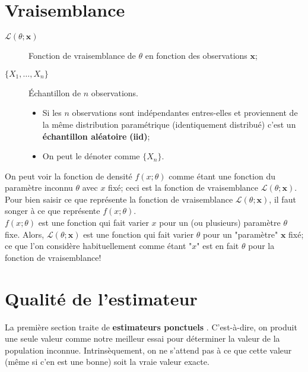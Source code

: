 \documentclass[10pt, french]{article}
\begin{document}
\begin{multicols*}{2}
\columnbreak
\section{Vraisemblance}
\begin{distributions}[Notation]
\begin{description}
	\item[$\mathcal{L}(\theta; \bm{x})$]	Fonction de vraisemblance de $\theta$ en fonction des observations $\bm{x}$;
	\item[$\{X_{1}, \dots, X_{n}\}$]	Échantillon de $n$ observations.
		\begin{itemize}[leftmargin = *]
		\item	Si les $n$ observations sont indépendantes entres-elles et proviennent de la même distribution paramétrique (identiquement distribué) c'est un \textbf{échantillon aléatoire} \textbf{(iid)};
		\item	On peut le dénoter comme $\{X_{n}\}$.
		\end{itemize}
\end{description}
\end{distributions}

On peut voir la fonction de densité $f(x; \theta)$ comme étant une fonction du paramètre inconnu $\theta$ avec $x$ fixé; ceci est la fonction de vraisemblance $\mathcal{L}(\theta; \bm{x})$.
Pour bien saisir ce que représente la fonction de vraisemblance $\mathcal{L}(\theta; \bm{x})$, il faut songer à ce que représente $f(x; \theta)$. \\
$f(x; \theta)$ est une fonction qui fait varier $x$ pour un (ou plusieurs) paramètre $\theta$ fixe. Alors, $\mathcal{L}(\theta; \bm{x})$ est une fonction qui fait varier $\theta$ pour un "paramètre" $\bm{x}$ fixé; ce que l'on considère habituellement comme étant "$x$" est en fait $\theta$ pour la fonction de vraisemblance!

\columnbreak
\section{Qualité de l'estimateur}

La première section traite de \guillemotleft \textbf{estimateurs ponctuels} \guillemotright. 
C'est-à-dire, on produit une seule valeur comme notre meilleur essai pour déterminer la valeur de la population inconnue.
Intrinsèquement, on ne s'attend pas à ce que cette valeur (même si c'en est une bonne) soit la vraie valeur exacte.\\


\end{multicols*}
\end{document}

